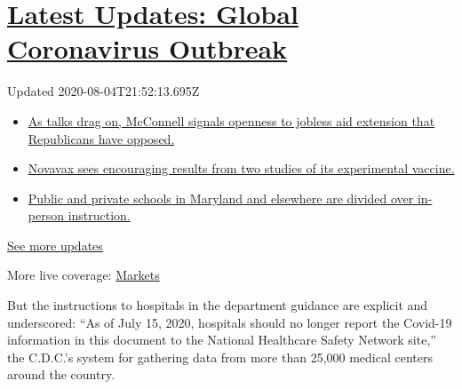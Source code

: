 \hypertarget{latest-updates-global-coronavirus-outbreak}{%
\section{\texorpdfstring{\href{https://www.nytimes3xbfgragh.onion/2020/08/04/world/coronavirus-cases.html?action=click\&pgtype=Article\&state=default\&region=MAIN_CONTENT_1\&context=storylines_live_updates}{Latest
Updates: Global Coronavirus
Outbreak}}{Latest Updates: Global Coronavirus Outbreak}}\label{latest-updates-global-coronavirus-outbreak}}

Updated 2020-08-04T21:52:13.695Z

\begin{itemize}
\tightlist
\item
  \href{https://www.nytimes3xbfgragh.onion/2020/08/04/world/coronavirus-cases.html?action=click\&pgtype=Article\&state=default\&region=MAIN_CONTENT_1\&context=storylines_live_updates\#link-2daa96b5}{As
  talks drag on, McConnell signals openness to jobless aid extension
  that Republicans have opposed.}
\item
  \href{https://www.nytimes3xbfgragh.onion/2020/08/04/world/coronavirus-cases.html?action=click\&pgtype=Article\&state=default\&region=MAIN_CONTENT_1\&context=storylines_live_updates\#link-1228a480}{Novavax
  sees encouraging results from two studies of its experimental
  vaccine.}
\item
  \href{https://www.nytimes3xbfgragh.onion/2020/08/04/world/coronavirus-cases.html?action=click\&pgtype=Article\&state=default\&region=MAIN_CONTENT_1\&context=storylines_live_updates\#link-4825b93}{Public
  and private schools in Maryland and elsewhere are divided over
  in-person instruction.}
\end{itemize}

\href{https://www.nytimes3xbfgragh.onion/2020/08/04/world/coronavirus-cases.html?action=click\&pgtype=Article\&state=default\&region=MAIN_CONTENT_1\&context=storylines_live_updates}{See
more updates}

More live coverage:
\href{https://www.nytimes3xbfgragh.onion/live/2020/08/04/business/stock-market-today-coronavirus?action=click\&pgtype=Article\&state=default\&region=MAIN_CONTENT_1\&context=storylines_live_updates}{Markets}

But the instructions to hospitals in the department guidance are
explicit and underscored: ``As of July 15, 2020, hospitals should no
longer report the Covid-19 information in this document to the National
Healthcare Safety Network site,'' the C.D.C.'s system for gathering data
from more than 25,000 medical centers around the country.

